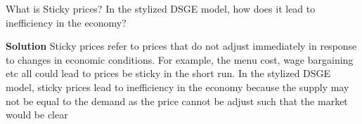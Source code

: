 \documentclass[addpoints,12pt,answers]{exam}
\begin{document}
\begin{questions}
		
		\question  What is Sticky prices? In the stylized DSGE model, how does it lead to inefficiency in the economy?
		
		\textbf{Solution}
		Sticky prices refer to prices that do not adjust immediately in response to changes in economic conditions. For example, the menu cost, wage bargaining etc all could lead to prices be sticky in the short run. 
		In the stylized DSGE model, sticky prices lead to inefficiency in the economy because the supply may not be equal to the demand as the price cannot be adjust such that the market would be clear
		

%		
		\vfill
		
		
		
		
%		
%		
%		
		
	\end{questions}
	
	
\end{document}
